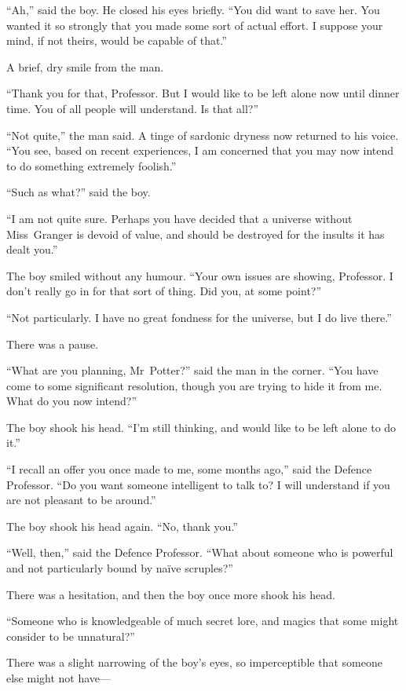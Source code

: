 “Ah,” said the boy. He closed his eyes briefly. “You did want to save her. You wanted it so strongly that you made some sort of actual effort. I suppose your mind, if not theirs, would be capable of that.”

A brief, dry smile from the man.

“Thank you for that, Professor. But I would like to be left alone now until dinner time. You of all people will understand. Is that all?”

“Not quite,” the man said. A tinge of sardonic dryness now returned to his voice. “You see, based on recent experiences, I am concerned that you may now intend to do something extremely foolish.”

“Such as what?” said the boy.

“I am not quite sure. Perhaps you have decided that a universe without Miss~Granger is devoid of value, and should be destroyed for the insults it has dealt you.”

The boy smiled without any humour. “Your own issues are showing, Professor. I don’t really go in for that sort of thing. Did you, at some point?”

“Not particularly. I have no great fondness for the universe, but I do live there.”

There was a pause.

“What are you planning, Mr~Potter?” said the man in the corner. “You have come to some significant resolution, though you are trying to hide it from me. What do you now intend?”

The boy shook his head. “I’m still thinking, and would like to be left alone to do it.”

“I recall an offer you once made to me, some months ago,” said the Defence Professor. “Do you want someone intelligent to talk to? I will understand if you are not pleasant to be around.”

The boy shook his head again. “No, thank you.”

“Well, then,” said the Defence Professor. “What about someone who is powerful and not particularly bound by naïve scruples?”

There was a hesitation, and then the boy once more shook his head.

“Someone who is knowledgeable of much secret lore, and magics that some might consider to be unnatural?”

There was a slight narrowing of the boy’s eyes, so imperceptible that someone else might not have—

